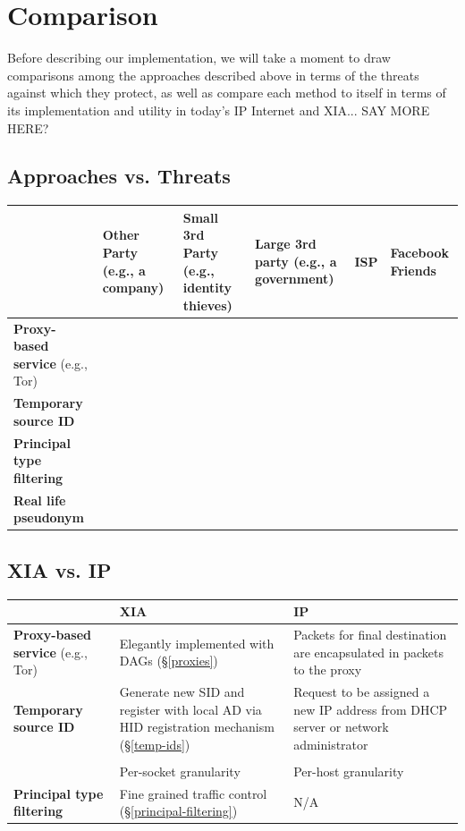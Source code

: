 \documentclass{article}
\begin{document}
\section{Comparison}
\label{comparison}
Before describing our implementation, we will take a moment to draw comparisons among the approaches described above in terms of the threats against which they protect, as well as compare each method to itself in terms of its implementation and utility in today's IP Internet and XIA... SAY MORE HERE?

\subsection{Approaches vs. Threats}
\begin{center}
	\begin{tabular}{p{2cm} || p{2.5cm} | p{2.5cm} | p{2.5cm} | p{2.5cm} | p{2.5cm}}
	& \textbf{Other Party (e.g., a company)} &	\textbf{Small 3rd Party (e.g., identity thieves)} & \textbf{Large 3rd party (e.g., a government)} & \textbf{ISP} & \textbf{Facebook Friends}\\
	\hline
	\hline
	{\bf Proxy-based service} (e.g., Tor)&&&&\\
	\hline
	{\bf Temporary source ID} &&&&\\
	\hline
	{\bf Principal type filtering} &&&&\\
	\hline
	{\bf Real life pseudonym} &&&&\\
	\hline
	\end{tabular}
\end{center}


\subsection{XIA vs. IP}
\begin{center}
	\begin{tabular}{p{3cm} || p{4.5cm} | p{4.5cm}}
	& \textbf{XIA} 	&	\textbf{IP}\\
	\hline
	\hline
	{\bf Proxy-based service} (e.g., Tor) & Elegantly implemented with DAGs (\S\ref{proxies}) & Packets for final destination are encapsulated in packets to the proxy\\
	\hline
	{\bf Temporary source ID} & Generate new SID and register with local AD via HID registration mechanism (\S\ref{temp-ids}) & Request to be assigned a new IP address from DHCP server or network administrator\\
	& & \\
	& Per-socket granularity & Per-host granularity\\
	\hline
	{\bf Principal type filtering} & Fine grained traffic control (\S\ref{principal-filtering})& N/A \\
	\hline
	\end{tabular}
\end{center}
\end{document}
